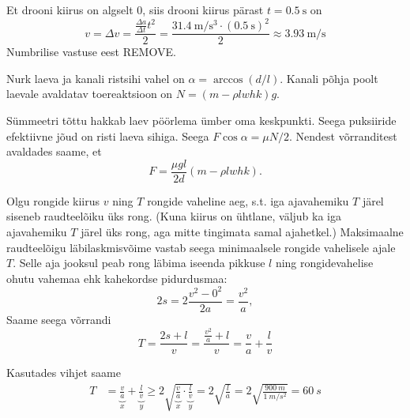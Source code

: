 \documentclass[10pt]{article}
\newcommand{\p}[1]{REMOVE}
\begin{document}
Et drooni kiirus on algselt 0, siis drooni kiirus pärast $t=\SI{0.5}{\s}$ on
\begin{equation*}
    v = \Delta v = \frac{\frac{\Delta a}{\Delta t}t^2}{2} = \frac{\SI{31.4}{\m\per\s\cubed}\cdot (\SI{0.5}{\s})^2}{2} \approx \SI{3.93}{\m\per\s}
\end{equation*}
Numbrilise vastuse eest \p{1}.
\probend
\bigskip


\solu
\par
Nurk laeva ja kanali ristsihi vahel on $ \alpha = \arccos (d/l)$. Kanali põhja poolt laevale avaldatav toereaktsioon on $N = (m-\rho lwh k) g$.

Sümmeetri tõttu hakkab laev pöörlema ümber oma keskpunkti. Seega puksiiride efektiivne jõud on risti laeva sihiga. Seega $F \cos \alpha = \mu N/2$. Nendest võrranditest avaldades saame, et
\begin{equation*}
F=\frac{\mu g l}{2d} (m-\rho l w h k).
\end{equation*}
\probend
\bigskip


\solu
Olgu rongide kiirus $v$ ning $T$ rongide vaheline aeg, s.t. iga ajavahemiku $T$ järel siseneb raudteelõiku üks rong. (Kuna kiirus on ühtlane, väljub ka iga ajavahemiku $T$ järel üks rong, aga mitte tingimata samal ajahetkel.) Maksimaalne raudteelõigu läbilaskmisvõime vastab seega minimaalsele rongide vahelisele ajale $T$. Selle aja jooksul peab rong läbima iseenda pikkuse $l$ ning rongidevahelise ohutu vahemaa ehk kahekordse pidurdusmaa:
\begin{equation*}
    2s = 2\frac{v^2-0^2}{2a}=\frac{v^2}{a},
\end{equation*}
Saame seega võrrandi 
\begin{equation*}
    T = \frac{2s+l}{v} = \frac{\frac{v^2}{a}+l}{v} = \frac{v}{a} + \frac{l}{v} \tag{I}
\end{equation*}

Kasutades vihjet saame
\begin{align*}
    T &= \underbrace{\frac{v}{a}}_{x} + \underbrace{\frac{l}{v}}_{y} \geq 2 \sqrt{\underbrace{\frac{v}{a}}_{x} \cdot \underbrace{\frac{l}{v}}_{y}} 
    = 2\sqrt{\frac{l}{a}} = 2 \sqrt{\frac{\SI{900}{m}}{\SI{1}{m/s^2}}} = \SI{60}{s} \tag{II}
\end{align*}
\end{document}
